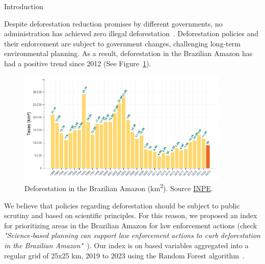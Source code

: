 \documentclass[20pt]{beamer}
\begin{document}
\vspace*{-2cm}
\begin{frame}[fragile,t]
\begin{columns}[t]


\begin{column}{0.33\linewidth}
\vspace{1cm}
    \begin{block}{Introduction\vphantom{g}}
    
Despite deforestation reduction promises by different governments, no administration has achieved zero illegal deforestation~\cite{dearealeaopereira2019}.
Deforestation policies and their enforcement are subject to government changes, challenging long-term environmental planning. 
As a result, deforestation in the Brazilian Amazon has had a positive trend since 2012 (See Figure~\ref{fig:deforestation_prodes}).

\vspace{1cm}
\begin{figure}[ht]
\centering
\includegraphics[width=0.9\textwidth]{fig_poster/taxa_desmatamento_2023.png}
\caption{Deforestation in the Brazilian Amazon (\unit{\km\squared}). Source \href{http://terrabrasilis.dpi.inpe.br}{INPE}.}
\label{fig:deforestation_prodes}
\end{figure}
\vspace{1cm}

We believe that policies regarding deforestation should be subject to public scrutiny and based on scientific principles. 
For this reason, we proposed an index for prioritizing areas in the Brazilian Amazon for law enforcement actions (check \emph{"Science‐based planning can support law enforcement actions to curb deforestation in the Brazilian Amazon"}~\cite{mataveli2022}).
Our index is on based variables aggregated into a regular grid of 25x25 km, 2019 to 2023 using the Random Forest algorithm~\cite{mataveli2023}.


\end{block}
\end{column}
\end{columns}
\end{frame}
\end{document}
